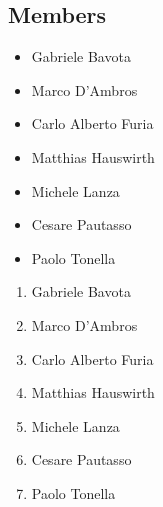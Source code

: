 \subsection{Members}

\begin{itemize}

\item Gabriele Bavota
\item Marco D'Ambros
\item Carlo Alberto Furia
\item Matthias Hauswirth
\item Michele Lanza
\item Cesare Pautasso
\item Paolo Tonella

\end{itemize}

\begin{enumerate}

\item Gabriele Bavota
\item Marco D'Ambros
\item Carlo Alberto Furia
\item Matthias Hauswirth
\item Michele Lanza \cite{Lanz2006a}
\item Cesare Pautasso
\item Paolo Tonella

\end{enumerate}